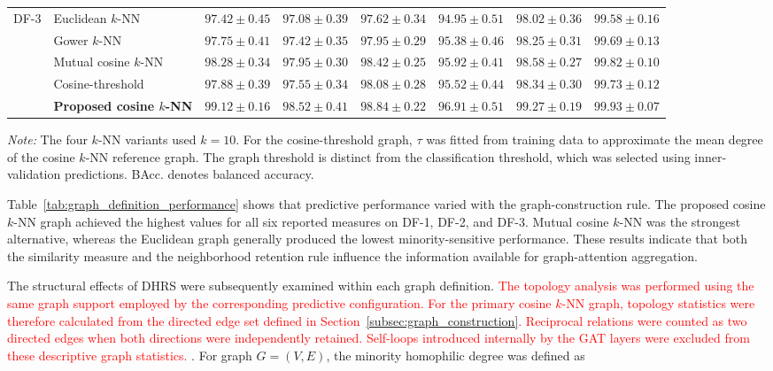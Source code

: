 \documentclass[pdflatex,sn-mathphys-num]{sn-jnl}%
\theoremstyle{thmstyleone}%
\theoremstyle{thmstyletwo}%
\theoremstyle{thmstylethree}%
\begin{document}
\begin{table}[!ht]
{\begin{tabular}{@{}llcccccc@{}}
\multirow{5}{*}{DF-3}
& Euclidean \(k\)-NN
& $97.42\pm0.45$ & $97.08\pm0.39$ & $97.62\pm0.34$
& $94.95\pm0.51$ & $98.02\pm0.36$ & $99.58\pm0.16$ \\
& Gower \(k\)-NN
& $97.75\pm0.41$ & $97.42\pm0.35$ & $97.95\pm0.29$
& $95.38\pm0.46$ & $98.25\pm0.31$ & $99.69\pm0.13$ \\
& Mutual cosine \(k\)-NN
& $98.28\pm0.34$ & $97.95\pm0.30$ & $98.42\pm0.25$
& $95.92\pm0.41$ & $98.58\pm0.27$ & $99.82\pm0.10$ \\
& Cosine-threshold
& $97.88\pm0.39$ & $97.55\pm0.34$ & $98.08\pm0.28$
& $95.52\pm0.44$ & $98.34\pm0.30$ & $99.73\pm0.12$ \\
& \textbf{Proposed cosine \(k\)-NN}
& \textbf{$99.12\pm0.16$} & \textbf{$98.52\pm0.41$}
& \textbf{$98.84\pm0.22$} & \textbf{$96.91\pm0.51$}
& \textbf{$99.27\pm0.19$} & \textbf{$99.93\pm0.07$} \\
\bottomrule
\end{tabular}%
}

\vspace{2pt}

\begin{minipage}{0.98\textwidth}
\footnotesize
\textit{Note:} The four \(k\)-NN variants used \(k=10\). For the
cosine-threshold graph, \(\tau\) was fitted from training data to approximate
the mean degree of the cosine \(k\)-NN reference graph. The graph threshold
is distinct from the classification threshold, which was selected using
inner-validation predictions. BAcc. denotes balanced accuracy.
\end{minipage}
\end{table}

 {
Table~\ref{tab:graph_definition_performance} shows that predictive performance
varied with the graph-construction rule. The proposed cosine \(k\)-NN graph
achieved the highest values for all six reported measures on DF-1, DF-2, and
DF-3. Mutual cosine \(k\)-NN was the strongest alternative, whereas the
Euclidean graph generally produced the lowest minority-sensitive performance.
These results indicate that both the similarity measure and the neighborhood
retention rule influence the information available for graph-attention
aggregation.
}

 {
The structural effects of DHRS were subsequently examined within each graph
definition. \textcolor{red}{
The topology analysis was performed using the same graph support employed by
the corresponding predictive configuration. For the primary cosine
\(k\)-NN graph, topology statistics were therefore calculated from the
directed edge set defined in Section~\ref{subsec:graph_construction}.
Reciprocal relations were counted as two directed edges when both directions
were independently retained. Self-loops introduced internally by the GAT
layers were excluded from these descriptive graph statistics.
}. For graph
\(G=(V,E)\), the minority homophilic degree was defined as
}
\end{document}

